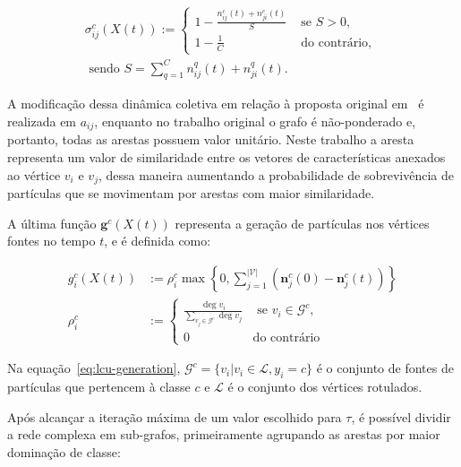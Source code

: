 \begin{equation}\label{eq:lcu-sigma}
\begin{aligned}
\sigma_{i j}^c(X(t)):= \begin{cases}1-\frac{n_{i j}^c(t)+n_{j i}^c(t)}{S} & \text { se } S>0, \\
1-\frac{1}{C} & \text { do contrário, }\end{cases} \\
\text { sendo } S=\sum_{q=1}^C n_{i j}^q(t)+n_{j i}^q(t) .
\end{aligned}
\end{equation}

A modificação dessa dinâmica coletiva em relação à proposta original
em~\cite{VerriNetworkUnfoldingMap2018} é realizada em $a_{ij}$,
enquanto no trabalho original o grafo é não-ponderado e, portanto,
todas as arestas possuem valor unitário. Neste trabalho a aresta representa um
valor de similaridade entre os vetores de características anexados ao
vértice $v_i$ e $v_j$, dessa maneira aumentando a probabilidade de
sobrevivência de partículas que se movimentam por arestas com maior
similaridade.

A última função $\mathbf{g}^c(X(t))$ representa a geração de
partículas nos vértices fontes no tempo $t$, e é definida como:

\begin{equation}\label{eq:lcu-generation}
  \begin{aligned}
    g_i^c(X(t)) &:=\rho_i^c \max \left\{0, \sum_{j=1}^{\left| \mathcal{V} \right|}(\mathbf{n}_{j}^c(0) - \mathbf{n}_{j}^c(t))\right\} \\
    \rho_i^c &:= \begin{cases}\frac{\deg v_i}{\sum_{v_j \in \mathcal{G}^c}
      \deg v_j} & \text { se } v_i \in \mathcal{G}^c, \\ 0 & \text {
                                                               do contrário }\end{cases}
  \end{aligned}
\end{equation}

Na equação~\ref{eq:lcu-generation}, $\mathcal{G}^c = \{v_i |v_i \in \mathcal{L}, y_i = c\}$
é o conjunto de fontes de partículas que pertencem à classe $c$ e $\mathcal{L}$
é o conjunto dos vértices rotulados.


Após alcançar a iteração máxima de um valor escolhido para $ \tau $, é possível
dividir a rede complexa em sub-grafos, primeiramente agrupando as
arestas por maior dominação de classe:

